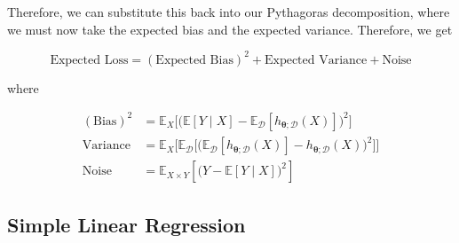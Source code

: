 \documentclass{article}
\begin{document}
    Therefore, we can substitute this back into our Pythagoras decomposition, where we must now take the expected bias and the expected variance. Therefore, we get 

      \[\text{Expected Loss} = (\text{Expected Bias})^2 + \text{Expected Variance} + \text{Noise}\]

    where 

    \begin{align*}
      (\text{Bias})^2 & = \mathbb{E}_X \big[ \big( \mathbb{E}[Y \mid X] - \mathbb{E}_\mathcal{D} [h_{{\boldsymbol{\theta}}; \mathcal{D}} (X)] \big)^2 \big] \\
      \text{Variance} & = \mathbb{E}_X \big[ \mathbb{E}_\mathcal{D} \big[ \big( \mathbb{E}_\mathcal{D} [h_{{\boldsymbol{\theta}}; \mathcal{D}} (X)] - h_{\boldsymbol{\theta}; \mathcal{D}}(X) \big)^2 \big] \big] \\
      \text{Noise} & = \mathbb{E}_{X \times Y}[\big(Y - \mathbb{E}[Y \mid X]\big)^2]
    \end{align*}


  \subsection{Simple Linear Regression}
\end{document}
